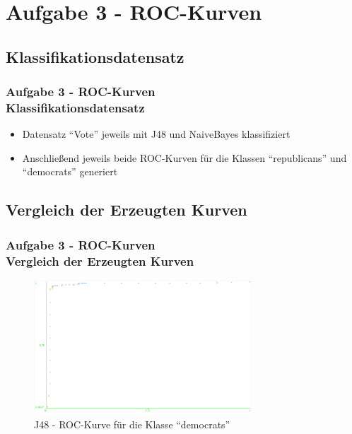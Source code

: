 \documentclass[accentcolor=tud6b,colorbacktitle,inverttitle,landscape,german,presentation,t]{tudbeamer}
\begin{document}
    \section{Aufgabe 3 - ROC-Kurven}
    
    \subsection{Klassifikationsdatensatz}
    
    \begin{frame}[t]
    \frametitle{Aufgabe 3 - ROC-Kurven\\ Klassifikationsdatensatz}
        \vfill
        \begin{itemize}
            \item Datensatz ``Vote'' jeweils mit J48 und NaiveBayes klassifiziert
            \item Anschließend jeweils beide ROC-Kurven für die Klassen ``republicans'' und ``democrats'' generiert
        \end{itemize}
    \end{frame}
    
    \subsection{Vergleich der Erzeugten Kurven}
    
    \begin{frame}[t]
    \frametitle{Aufgabe 3 - ROC-Kurven\\ Vergleich der Erzeugten Kurven}
        \begin{figure}[htbp]
            \centering
            \includegraphics[height=5cm]{roc-j48-democrats}
            \caption{J48 - ROC-Kurve für die Klasse ``democrats''}
        \end{figure}
    \end{frame}
    
\end{document}
